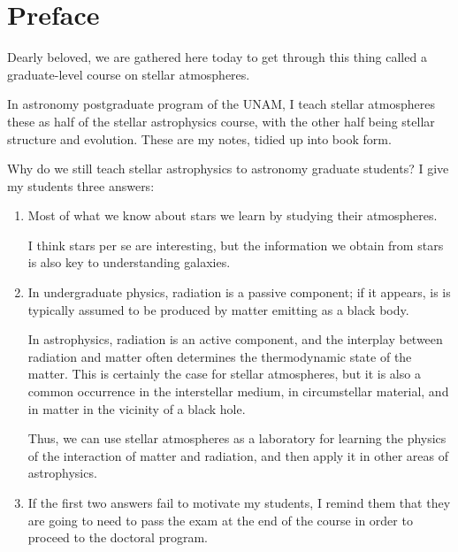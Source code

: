 
\chapter*{Preface}

\noindent
Dearly beloved, we are gathered here today to get through this thing called a graduate-level course on stellar atmospheres.


In astronomy postgraduate program of the UNAM, I teach stellar atmospheres these as half of the stellar astrophysics course, with the other half being stellar structure and evolution. These are my notes, tidied up into book form.

Why do we still teach stellar astrophysics to astronomy graduate students? I give my students three answers:

\begin{enumerate}

\item
Most of what we know about stars we learn by studying their atmospheres.

I think stars per se are interesting, but the information we obtain from stars is also key to understanding galaxies.

\item
In undergraduate physics, radiation is a passive component; if it appears, is is typically assumed to be produced by matter emitting as a black body. 

In astrophysics, radiation is an active component, and the interplay between radiation and matter often determines the thermodynamic state of the matter. This is certainly the case for stellar atmospheres, but it is also a common occurrence in the interstellar medium, in circumstellar material, and in matter in the vicinity of a black hole. 

Thus, we can use stellar atmospheres as a laboratory for learning the physics of the interaction of matter and radiation, and then apply it in other areas of astrophysics.

\item 
If the first two answers fail to motivate my students, I remind them that they are going to need to pass the exam at the end of the course in order to proceed to the doctoral program.
\end{enumerate}